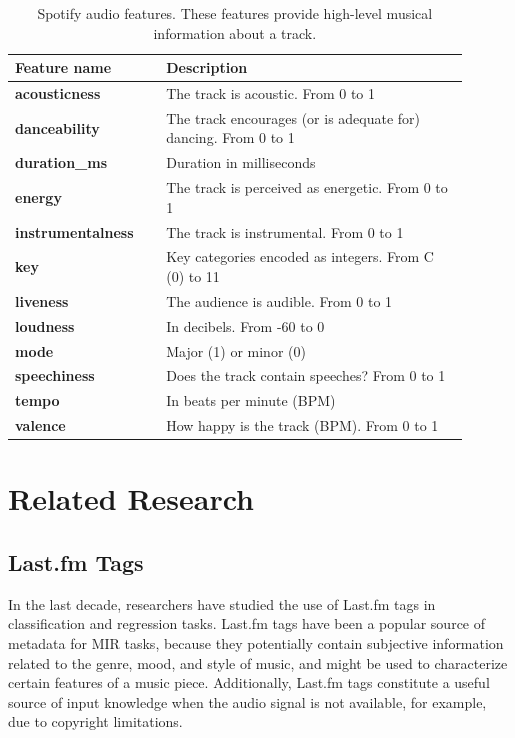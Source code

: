 \documentclass[sn-mathphys]{sn-jnl}%
\theoremstyle{thmstyleone}%
\theoremstyle{thmstyletwo}%
\theoremstyle{thmstylethree}%
\begin{document}
\begin{table}[h!]
      \centering
      \caption{Spotify audio features. These features provide high-level musical information about a track.} \label{table:spotify-features}
      \begin{tabular}{p{0.3\linewidth}p{0.6\linewidth}}
          \toprule
          \bfseries \textbf{Feature name} & \textbf{Description} \\
          \midrule
          \textbf{acousticness} & The track is acoustic. From 0 to 1 \\
          \textbf{danceability} & The track encourages (or is adequate for) dancing. From 0 to 1 \\
          \textbf{duration\_ms}  &  Duration in milliseconds \\
          \textbf{energy}  &  The track is perceived as energetic. From 0 to 1\\
          \textbf{instrumentalness}  &  The track is instrumental. From 0 to 1 \\
          \textbf{key}  &  Key categories encoded as integers. From C (0) to 11 \\
          \textbf{liveness}  &  The audience is audible. From 0 to 1\\
          \textbf{loudness}  &  In decibels. From -60 to 0 \\
          \textbf{mode}  & Major (1) or minor (0) \\
          \textbf{speechiness}  & Does the track contain speeches? From 0 to 1 \\
          \textbf{tempo}  & In beats per minute (BPM) \\
          \textbf{valence} & How happy is the track (BPM). From 0 to 1 \\
          \bottomrule
      \end{tabular}
  \end{table}


\section{Related Research}

\subsection{Last.fm Tags}

In the last decade, researchers have studied the use of Last.fm tags in classification and regression tasks.
Last.fm tags have been a popular source of metadata for MIR tasks,
because they potentially contain subjective information related to the genre, mood, and style of music,
and might be used to characterize certain features of a music piece.
Additionally, Last.fm tags constitute a useful source of input knowledge when the audio signal is not available,
for example, due to copyright limitations.
\end{document}
